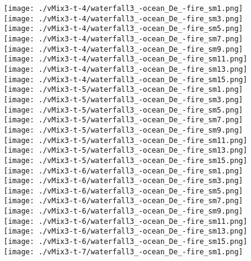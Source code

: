 \begin{figure}[ht!]
{    %
    \texttt{[image: ./vMix3-t-4/waterfall3\_-ocean\_De\_-fire\_sm1.png]}
    \texttt{[image: ./vMix3-t-4/waterfall3\_-ocean\_De\_-fire\_sm3.png]}
    \texttt{[image: ./vMix3-t-4/waterfall3\_-ocean\_De\_-fire\_sm5.png]}
    \texttt{[image: ./vMix3-t-4/waterfall3\_-ocean\_De\_-fire\_sm7.png]}
    \texttt{[image: ./vMix3-t-4/waterfall3\_-ocean\_De\_-fire\_sm9.png]}
    \texttt{[image: ./vMix3-t-4/waterfall3\_-ocean\_De\_-fire\_sm11.png]}
    \texttt{[image: ./vMix3-t-4/waterfall3\_-ocean\_De\_-fire\_sm13.png]}
    \texttt{[image: ./vMix3-t-4/waterfall3\_-ocean\_De\_-fire\_sm15.png]} \\
\vspace{1mm}
    \texttt{[image: ./vMix3-t-5/waterfall3\_-ocean\_De\_-fire\_sm1.png]}
    \texttt{[image: ./vMix3-t-5/waterfall3\_-ocean\_De\_-fire\_sm3.png]}
    \texttt{[image: ./vMix3-t-5/waterfall3\_-ocean\_De\_-fire\_sm5.png]}
    \texttt{[image: ./vMix3-t-5/waterfall3\_-ocean\_De\_-fire\_sm7.png]}
    \texttt{[image: ./vMix3-t-5/waterfall3\_-ocean\_De\_-fire\_sm9.png]}
    \texttt{[image: ./vMix3-t-5/waterfall3\_-ocean\_De\_-fire\_sm11.png]}
    \texttt{[image: ./vMix3-t-5/waterfall3\_-ocean\_De\_-fire\_sm13.png]}
    \texttt{[image: ./vMix3-t-5/waterfall3\_-ocean\_De\_-fire\_sm15.png]} \\
\vspace{1mm}
    \texttt{[image: ./vMix3-t-6/waterfall3\_-ocean\_De\_-fire\_sm1.png]}
    \texttt{[image: ./vMix3-t-6/waterfall3\_-ocean\_De\_-fire\_sm3.png]}
    \texttt{[image: ./vMix3-t-6/waterfall3\_-ocean\_De\_-fire\_sm5.png]}
    \texttt{[image: ./vMix3-t-6/waterfall3\_-ocean\_De\_-fire\_sm7.png]}
    \texttt{[image: ./vMix3-t-6/waterfall3\_-ocean\_De\_-fire\_sm9.png]}
    \texttt{[image: ./vMix3-t-6/waterfall3\_-ocean\_De\_-fire\_sm11.png]}
    \texttt{[image: ./vMix3-t-6/waterfall3\_-ocean\_De\_-fire\_sm13.png]}
    \texttt{[image: ./vMix3-t-6/waterfall3\_-ocean\_De\_-fire\_sm15.png]} \\
\vspace{1mm}
    \texttt{[image: ./vMix3-t-7/waterfall3\_-ocean\_De\_-fire\_sm1.png]}
}
\end{figure}
